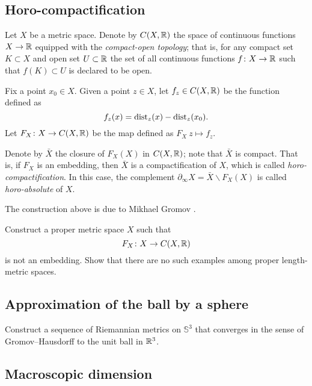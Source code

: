\subsection*{Horo-compactification\easy}
\label{Horocompactification}

Let $X$ be a metric space.
Denote by $C(X,\mathbb{R})$ the space of continuous functions $X\to \mathbb{R}$
equipped with the \emph{compact-open topology};
that is, for any compact set $K\subset X$ and open set $U\subset \mathbb{R}$
the set of all continuous functions $f\colon X\to \mathbb{R}$ such that $f(K)\subset U$
is declared to be open.

Fix a point $x_0\in X$.
Given a point $z\in X$, let $f_z\in C(X,\mathbb{R})$ be the function defined as 
\[f_z(x)=\operatorname{\rm dist}\nolimits_z(x)-\operatorname{\rm dist}\nolimits_z(x_0).\]
Let $F_X\colon X\to C(X,\mathbb{R})$ be the map 
defined as $F_X\:z\mapsto f_z$.

Denote by $\bar X$ 
the closure of $F_X(X)$ in $C(X,\mathbb{R})$;
note that $\bar X$ is compact.
That is, 
if $F_X$ is an embedding, 
then $\bar X$ is a compactification of $X$,
which is called \emph{horo-compactification}.
In this case, the complement 
$\partial_\infty X=\bar X\backslash F_X(X)$ 
is called {}\emph{horo-absolute} of $X$.

The construction above is due to Mikhael Gromov \cite[see][]{gromov-hyperbolic}.

\begin{pr}
Construct a proper metric space $X$
such that 
\[F_X\colon X\to C(X,\mathbb{R})\] 
is not an embedding.
Show that there are no such examples among proper length-metric spaces.
\end{pr}

\subsection*{Approximation of the ball by a sphere}
\label{3-sphere is close to a ball}

\begin{pr}
Construct a sequence of Riemannian metrics on $\mathbb{S}^3$ that converges in the sense of Gromov--Hausdorff 
to the unit ball in $\mathbb{R}^3$.
\end{pr}

\subsection*{Macroscopic dimension\easy}
\label{macroscopic dimension} 

